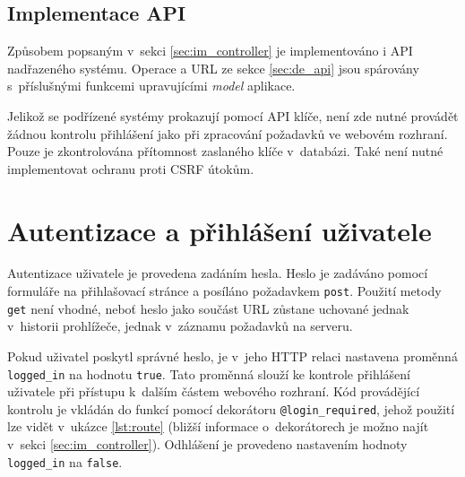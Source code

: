 
\subsection{Implementace API}


Způsobem popsaným v~sekci \ref{sec:im_controller} je implementováno i API nadřazeného systému. Operace a URL ze sekce \ref{sec:de_api} jsou spárovány s~příslušnými funkcemi upravujícími \textit{model} aplikace.

Jelikož se podřízené systémy prokazují pomocí API klíče, není zde nutné provádět žádnou kontrolu přihlášení jako při zpracování požadavků ve webovém rozhraní. Pouze je zkontrolována přítomnost zaslaného klíče v~databázi. Také není nutné implementovat ochranu proti CSRF útokům.

\section{Autentizace a přihlášení uživatele}
\label{sec:im_auth}

Autentizace uživatele je provedena zadáním hesla. Heslo je zadáváno pomocí formuláře na přihlašovací stránce a posíláno požadavkem \texttt{post}. Použití metody \texttt{get} není vhodné, neboť heslo jako součást URL zůstane uchované jednak v~historii prohlížeče, jednak v~záznamu požadavků na serveru.

Pokud uživatel poskytl správné heslo, je v~jeho HTTP relaci nastavena proměnná \texttt{logged\_in} na hodnotu \texttt{true}. Tato proměnná slouží ke kontrole přihlášení uživatele při přístupu k~dalším částem webového rozhraní. Kód provádějící kontrolu je vkládán do funkcí pomocí dekorátoru \texttt{@login\_required}, jehož použití lze vidět v~ukázce \ref{lst:route} (bližší informace o~dekorátorech je možno najít v~sekci \ref{sec:im_controller}). Odhlášení je provedeno nastavením hodnoty \texttt{logged\_in} na \texttt{false}.


